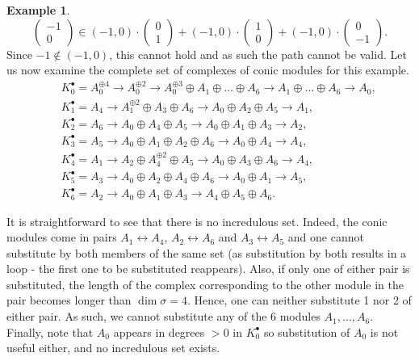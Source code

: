 \documentclass[reqno, 12pt]{amsart}
\theoremstyle{definition}
\newtheorem{example}[theorem]{Example}
\numberwithin{equation}{section}
\begin{document}
\begin{example}
\[    \begin{pmatrix}-1\\0\end{pmatrix}\in (-1,0)\cdot \begin{pmatrix}0\\1\end{pmatrix}+(-1,0)\cdot \begin{pmatrix}1\\0\end{pmatrix}+(-1,0)\cdot \begin{pmatrix}0\\-1\end{pmatrix}.
    \]
    Since $-1\not\in (-1,0)$, this cannot hold and as such the path cannot be valid.
    Let us now examine the complete set of complexes of conic modules for this example.\begin{eqnarray*}
        && K_0^\bullet= A_0^{\oplus4}\rightarrow A_0^{\oplus2}\rightarrow A_0^{\oplus3}\oplus A_1\oplus \dots\oplus A_6\rightarrow A_1\oplus\dots\oplus A_6\rightarrow A_0,\\
        && K_1^\bullet=A_4\rightarrow A_1^{\oplus2}\oplus A_3\oplus A_6\rightarrow A_0\oplus A_2\oplus A_5\rightarrow A_1,\\
        && K^\bullet_2=A_6\rightarrow A_0\oplus A_4\oplus A_5\rightarrow A_0\oplus A_1\oplus A_3\rightarrow A_2,\\
        && K_3^\bullet= A_5\rightarrow A_0\oplus A_1\oplus A_2\oplus A_6\rightarrow A_0\oplus A_4\rightarrow A_4,\\
        && K_4^\bullet= A_1\rightarrow A_2\oplus A_4^{\oplus2}\oplus A_5\rightarrow A_0\oplus A_3\oplus A_6\rightarrow A_4,\\
        && K_5^\bullet=A_3\rightarrow A_0\oplus A_2\oplus A_4\oplus A_6\rightarrow A_0\oplus A_1\rightarrow A_5,\\
        && K_6^\bullet =A_2\rightarrow A_0\oplus A_1\oplus A_3\rightarrow A_4\oplus A_5\oplus A_6.\;
    \end{eqnarray*}

    It is straightforward to see that there is no incredulous set. Indeed, the conic modules come in pairs $A_1\leftrightarrow A_4$, $A_2\leftrightarrow A_6$ and $A_3\leftrightarrow A_5$ and one cannot substitute by both members of the same set (as substitution by both results in a loop - the first one to be substituted reappears). Also, if only one of either pair is substituted, the length of the complex corresponding to the other module in the pair becomes longer than $\dim \sigma=4$. Hence, one can neither substitute 1 nor 2 of either pair. As such, we cannot substitute any of the 6 modules $A_1,\dots, A_6$. Finally, note that $A_0$ appears in degrees $>0$ in $K_0^\bullet$ so substitution of $A_0$ is not useful either, and no incredulous set exists.
\end{example}
\end{document}
